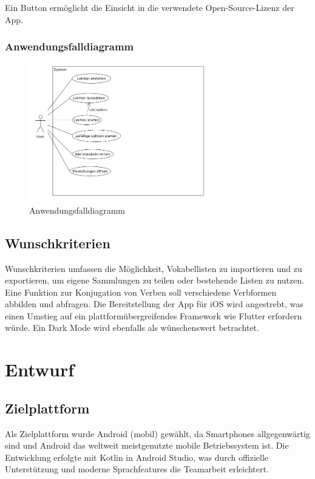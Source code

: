 \documentclass[12pt,a4paper]{article}
\begin{document}
Ein Button ermöglicht die Einsicht in die verwendete Open-Source-Lizenz der App.

\subsubsection{Anwendungsfalldiagramm}
\begin{figure}[H]
    \centering
    \includegraphics[width=0.7\textwidth]{use-case-diagramm.jpeg}
    \caption{Anwendungsfalldiagramm}
    \label{fig:festes_bild}
\end{figure}

\subsection{Wunschkriterien}
Wunschkriterien umfassen die Möglichkeit, Vokabellisten zu importieren und zu exportieren, um eigene Sammlungen zu teilen oder bestehende Listen zu nutzen. Eine Funktion zur Konjugation von Verben soll verschiedene Verbformen abbilden und abfragen. Die Bereitstellung der App für iOS wird angestrebt, was einen Umstieg auf ein plattformübergreifendes Framework wie Flutter erfordern würde. Ein Dark Mode wird ebenfalls als wünschenswert betrachtet.

\section{Entwurf}

\subsection{Zielplattform}
Als Zielplattform wurde Android (mobil) gewählt, da Smartphones allgegenwärtig sind und Android das weltweit meistgenutzte mobile Betriebssystem ist. Die Entwicklung erfolgte mit Kotlin in Android Studio, was durch offizielle Unterstützung und moderne Sprachfeatures die Teamarbeit erleichtert.
\end{document}
